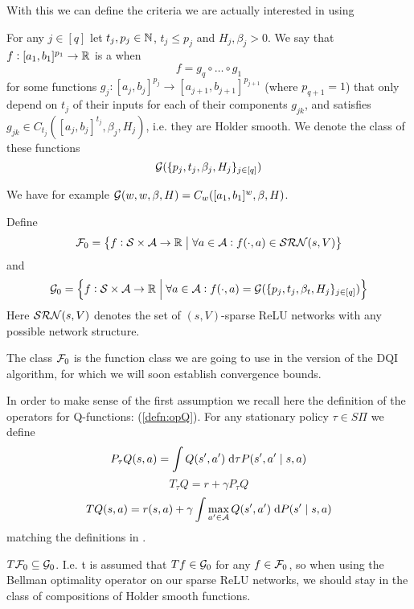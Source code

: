 With this we can define the criteria we are actually interested in
using

\begin{defn}
  For any $j \in [q]$ let $t_j, p_j \in \mathbb{N}$, $t_j\leq p_j$ and $H_j, \beta_j > 0$.
  We say that $f:[a_1, b_1]^{p_1} \to \mathbb{R}$
  is a  when
  \[ f = g_q \circ \dots \circ g_1 \]
  for some functions $g_j : [a_j, b_j]^{p_j} \to [a_{j+1}, b_{j+1}]^{p_{j+1}}$
  (where $p_{q+1} = 1$)
  that only depend on $t_j$ of their inputs
  for each of their components $g_{jk}$,
  and satisfies $g_{jk} \in C_{t_j}([a_j, b_j]^{t_j}, \beta_j, H_j)$, 
  i.e. they are Holder smooth.
  We denote the class of these functions
  \[ \mathcal{G}(\{p_j, t_j, \beta_j, H_j\}_{j \in [q]}) \]
\end{defn}

\begin{example}
  We have for example $\mathcal{G}(w, w, \beta, H) = C_w([a_1, b_1]^w, \beta, H)$.
\end{example}

\begin{defn}
  Define
  \[ \mathcal{F}_0 = \left\{ f : \mathcal{S} \times \mathcal{A} \to \mathbb{R} \;\middle\vert\;
  \forall a \in \mathcal{A} : f(\cdot, a) \in \mathcal{SRN}(s, V) \right\} \]
  and
  \[ \mathcal{G}_0 = \left\{ f : \mathcal{S} \times \mathcal{A} \to \mathbb{R}
      \;\middle\vert\; \forall a \in \mathcal{A} :
      f(\cdot, a) = \mathcal{G}(\{p_j, t_j, \beta_t, H_j\}_{j \in [q]})
  \right\} \]
  Here $\mathcal{SRN}(s, V)$ denotes the set of $(s, V)$-sparse ReLU networks
  with any possible network structure.
  \label{defn:F0G0}
\end{defn}

The class $\mathcal{F}_0$ is the function class we are going to use in the version
of the DQI algorithm, for which we will soon establish convergence bounds.

In order to make sense of the first assumption
we recall here the definition of the operators for Q-functions:
(\cref{defn:opQ}). For any stationary policy $\tau \in S\Pi$ we define
\[ P_\tau Q(s, a) = \int Q(s', a') \; \mathrm{d} \tau P(s', a' \mid s, a) \]
\[ T_\tau Q = r + \gamma P_\tau Q \]
\[ T Q(s, a) = r(s, a) + \gamma
\int \max_{a' \in \mathcal{A}} Q(s', a') \; \mathrm{d} P(s' \mid s, a) \]
matching the definitions in .

\begin{asm}
  $ T \mathcal{F}_0 \subseteq \mathcal{G}_0$.
  I.e. t is assumed that $T f \in \mathcal{G}_0$ for any $f \in \mathcal{F}_0$, 
  so when using the Bellman optimality operator on our sparse ReLU networks,
  we should stay in the class of compositions of Holder smooth functions.
  \label{asm:A1}
\end{asm}

